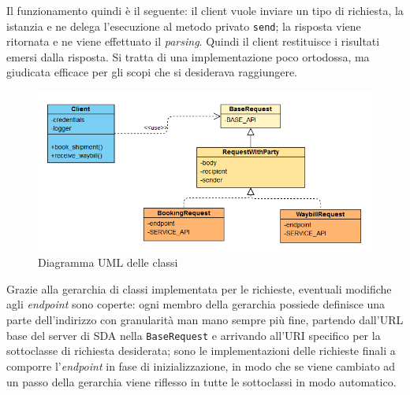 Il funzionamento quindi è il seguente: il client vuole inviare un tipo di richiesta, la istanzia e ne delega l'esecuzione al metodo privato \texttt{send}; la risposta viene ritornata e ne viene effettuato il \textit{parsing}. Quindi il client restituisce i risultati emersi dalla risposta. Si tratta di una implementazione poco ortodossa, ma giudicata efficace per gli scopi che si desiderava raggiungere.

\begin{figure}[h!]
    \includegraphics[width=\textwidth]{figures/classdia.png}
    \caption[ClassDia]{Diagramma UML delle classi
    \label{fig:classdia}}
\end{figure}    

Grazie alla gerarchia di classi implementata per le richieste, eventuali modifiche agli \textit{endpoint} sono coperte: ogni membro della gerarchia possiede definisce una parte dell'indirizzo con granularità man mano sempre più fine, partendo dall'URL base del server di SDA nella \texttt{BaseRequest} e arrivando all'URI specifico per la sottoclasse di richiesta desiderata; sono le implementazioni delle richieste finali a comporre l'\textit{endpoint} in fase di inizializzazione, in modo che se viene cambiato ad un passo della gerarchia viene riflesso in tutte le sottoclassi in modo automatico.

